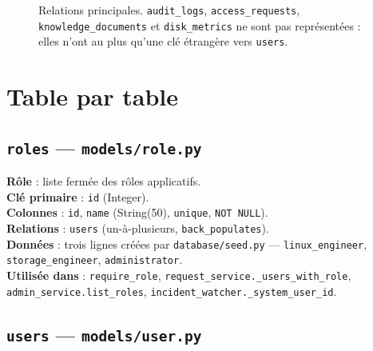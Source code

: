\documentclass[11pt,a4paper]{report}
\newcommand{\file}[1]{\texttt{\small #1}}
\newcommand{\fn}[1]{\texttt{\small\textcolor{oasisviolet}{#1}}}
\newcommand{\tbl}[1]{\texttt{\small\textcolor{oasisamber}{#1}}}
\begin{document}
\begin{figure}[h!]
\caption{Relations principales. \tbl{audit\_logs}, \tbl{access\_requests},
\tbl{knowledge\_documents} et \tbl{disk\_metrics} ne sont pas représentées :
elles n'ont au plus qu'une clé étrangère vers \tbl{users}.}
\end{figure}

\clearpage

\section{Table par table}

\subsection{\tbl{roles} --- \file{models/role.py}}

\textbf{Rôle} : liste fermée des rôles applicatifs.\\
\textbf{Clé primaire} : \texttt{id} (Integer).\\
\textbf{Colonnes} : \texttt{id}, \texttt{name} (String(50), \texttt{unique},
\texttt{NOT NULL}).\\
\textbf{Relations} : \texttt{users} (un-à-plusieurs, \texttt{back\_populates}).\\
\textbf{Données} : trois lignes créées par \file{database/seed.py} ---
\texttt{linux\_engineer}, \texttt{storage\_engineer}, \texttt{administrator}.\\
\textbf{Utilisée dans} : \fn{require\_role}, \fn{request\_service.\_users\_with\_role},
\fn{admin\_service.list\_roles}, \fn{incident\_watcher.\_system\_user\_id}.

\subsection{\tbl{users} --- \file{models/user.py}}
\end{document}
